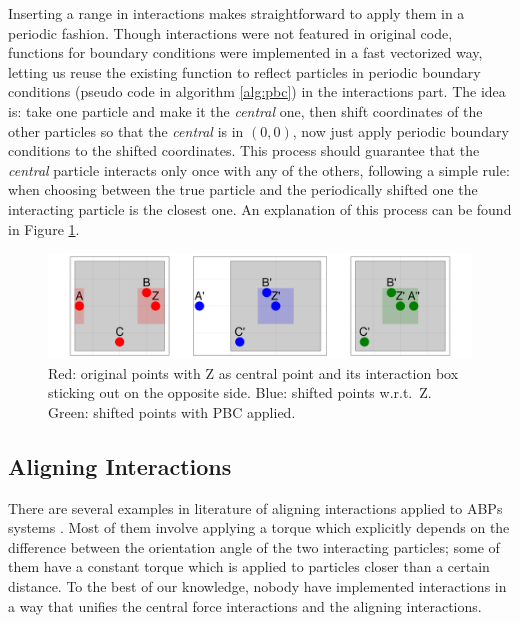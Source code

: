 \documentclass[../../master_thesis_np.tex]{subfiles}
\begin{document}
	Inserting a range in interactions makes straightforward to apply them in a periodic fashion. 
	Though interactions were not featured in original code, functions for boundary conditions were implemented in a fast vectorized way, letting us reuse the existing function to reflect particles in periodic boundary conditions (pseudo code in algorithm \ref{alg:pbc}) in the interactions part. 
	The idea is: take one particle and make it the \emph{central} one, then shift coordinates of the other particles so that the \emph{central} is in $(0,0)$, now just apply periodic boundary conditions to the shifted coordinates.
	This process should guarantee that the \emph{central} particle interacts only once with any of the others, following a simple rule: when choosing between the true particle and the periodically shifted one the interacting particle is the closest one.
	An explanation of this process can be found in Figure \ref{fig:periodicint}.
	
	\begin{figure}[htp]
		\centering
		\includegraphics[width=\textwidth]{periodic_interaction.png}
		\caption{Red: original points with Z as central point and its interaction box sticking out on the opposite side. Blue: shifted points w.r.t.\ Z. Green: shifted points with PBC applied.}
		\label{fig:periodicint}
	\end{figure}
	

	\subsection{Aligning Interactions} \label{alignint}

	There are several examples in literature of aligning interactions applied to ABPs systems \cite{martin-gomez_collective_2018, callegari_numerical_2019}.
	Most of them involve applying a torque which explicitly depends on the difference between the orientation angle of the two interacting particles; some of them have a constant torque which is applied to particles closer than a certain distance.
	To the best of our knowledge, nobody have implemented interactions in a way that unifies the central force interactions and the aligning interactions.
	
\end{document}
